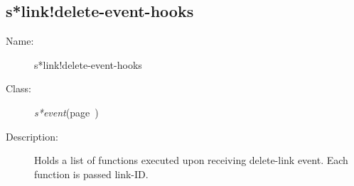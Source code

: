 \subsection{s*link!delete-event-hooks}
\label{s*link!delete-event-hooks}

\begin{description}
\item [Name:]  s*link!delete-event-hooks

\item [Class:]
{\sl s*event}\hfill(page~\pageref{s*event})

\item [Description:]
Holds a list of functions executed upon receiving
delete-link event.  Each function is passed link-ID.


\end{description}
